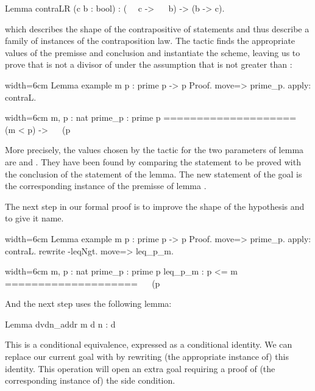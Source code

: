 \begin{coq}{}{}
Lemma contraLR (c b : bool) :  (~~ c -> ~~ b) -> (b -> c).
\end{coq}

which describes the shape of the contrapositive of statements and thus
describe a family of
instances of the contraposition law. The  tactic
finds the appropriate values of the premisse and conclusion and
instantiate the scheme, leaving us to prove that  is not a
divisor of  under the assumption that  is not
greater than :

\begin{coq}{}{width=6cm}
Lemma example m p : prime p ->
  p %
Proof.
move=> prime_p.
apply: contraL.
\end{coq}
\begin{coqout}{}{width=6cm}
m, p : nat
prime_p : prime p
====================
 ~~ (m < p) -> ~~ (p %
\end{coqout}

More precisely, the values chosen by the tactic for the two parameters
 of lemma  are  and
. They have been found by comparing the statement to be
proved with the conclusion  of the statement of the lemma.
The new statement of the goal is the corresponding instance of the
premisse  of lemma .

The next step in our formal proof is to improve the shape of the
hypothesis  and to give it name.


\begin{coq}{}{width=6cm}
Lemma example m p : prime p ->
  p %
Proof.
move=> prime_p.
apply: contraL.
rewrite -leqNgt.
move=> leq_p_m.
\end{coq}
\begin{coqout}{}{width=6cm}
m, p : nat
prime_p : prime p
leq_p_m :  p <= m
====================
 ~~ (p %
\end{coqout}
And the next step uses the following lemma:

\begin{coq}{}{}
Lemma dvdn_addr m d n : d %
\end{coq}
This is a conditional equivalence, expressed as a conditional identity.
We can replace our current goal with  by rewriting (the
appropriate instance of) this identity.  This operation will open an
extra goal requiring a proof of (the corresponding instance of) the side
condition.


